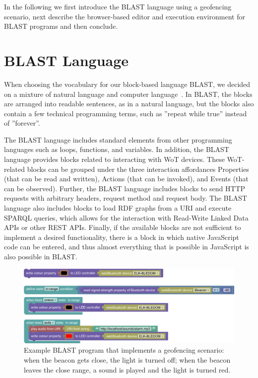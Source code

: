 \documentclass[runningheads]{llncs}
\begin{document}
In the following we first introduce the BLAST language using a geofencing scenario, next describe the browser-based editor and execution environment for BLAST programs and then conclude.

\section{BLAST Language}

When choosing the vocabulary for our block-based language BLAST, we decided on a mixture of natural language and computer language~\cite{8120404}.
In BLAST, the blocks are arranged into readable sentences, as in a natural language, but the blocks also contain a few technical programming terms, such as ''repeat while true'' instead of ''forever''.

The BLAST language includes standard elements from other programming languages such as loops, functions, and variables.
In addition, the BLAST language provides blocks related to interacting with WoT devices.
These WoT-related blocks can be grouped under the three interaction affordances Properties (that can be read and written), Actions (that can be invoked), and Events (that can be observed).
Further, the BLAST language includes blocks to send HTTP requests with arbitrary headers, request method and request body.
The BLAST language also includes blocks to load RDF graphs from a URI and execute SPARQL queries, which allows for the interaction with Read-Write Linked Data APIs or other REST APIs.
Finally, if the available blocks are not sufficient to implement a desired functionality, there is a block in which native JavaScript code can be entered, and thus almost everything that is possible in JavaScript is also possible in BLAST.

\begin{figure}
\includegraphics[width=.97\textwidth]{screenshot 3.png}%
\caption{Example BLAST program that implements a geofencing scenario: when the beacon gets close, the light is turned off; when the beacon leaves the close range, a sound is played and the light is turned red.} \label{fig1}
\end{figure}
\end{document}
